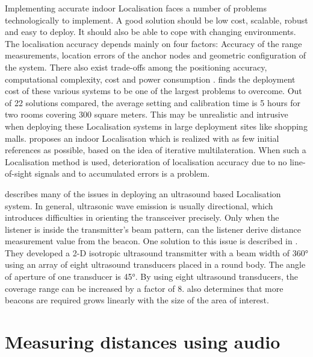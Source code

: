 \documentclass[]{final_report}
\begin{document}
Implementing accurate indoor Localisation faces a number of problems technologically to implement. A good solution should be low cost, scalable, robust and easy to deploy. It should also be able to cope with changing environments.  The localisation accuracy depends mainly on four factors:  Accuracy of the range measurements, location errors of the anchor nodes and geometric configuration of the system. There also exist trade-offs among the positioning accuracy, computational complexity, cost and power consumption \cite{xu2011performance}. \cite{xiao2016survey} finds the deployment cost of these various systems to be one of the largest problems to overcome. Out of 22 solutions compared, the average setting and calibration time is 5 hours for two rooms covering 300 square meters. This may be unrealistic and intrusive when deploying these Localisation systems in large deployment sites like shopping malls. \cite{minami2007design} proposes an indoor Localisation which is realized with as few initial references as possible, based on the idea of iterative multilateration. When such a Localisation method is used, deterioration of localisation accuracy due to no line-of-sight signals and to accumulated errors is a problem.

\cite{hsiao2008two} describes many of the issues in deploying an ultrasound based Localisation system. In general, ultrasonic wave emission is usually directional, which introduces difficulties in orienting the transceiver precisely. Only when the listener is inside the transmitter’s beam pattern, can the listener derive distance measurement value from the beacon. One solution to this issue is described in \cite{zhang2013tdoa}. They developed a 2-D isotropic ultrasound transmitter with a beam width of 360° using an array of eight ultrasound transducers placed in a round body. The angle of aperture of one transducer is 45°. By using eight ultrasound transducers, the coverage range can be increased by a factor of 8. \cite{hsiao2008two} also determines that more beacons are required grows linearly with the size of the area of interest. 



\chapter{\label{chapter3}  Measuring distances using audio}
\end{document}

